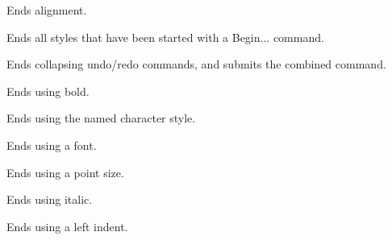 \label{wxrichtextbufferendalignment}


Ends alignment.

\label{wxrichtextbufferendallstyles}


Ends all styles that have been started with a Begin... command.

\label{wxrichtextbufferendbatchundo}


Ends collapsing undo/redo commands, and submits the combined command.

\label{wxrichtextbufferendbold}


Ends using bold.

\label{wxrichtextbufferendcharacterstyle}


Ends using the named character style.

\label{wxrichtextbufferendfont}


Ends using a font.

\label{wxrichtextbufferendfontsize}


Ends using a point size.

\label{wxrichtextbufferenditalic}


Ends using italic.

\label{wxrichtextbufferendleftindent}


Ends using a left indent.

\label{wxrichtextbufferendlinespacing}



